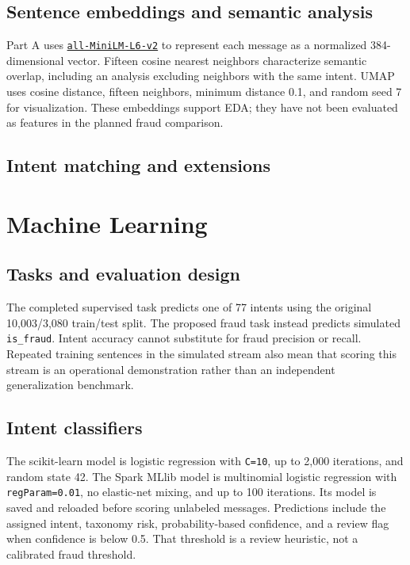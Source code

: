 \documentclass[
  english,
  11pt,
  letterpaper,
]{article}
\begin{document}
\subsection{Sentence embeddings and semantic
analysis}\label{sentence-embeddings-and-semantic-analysis}

Part A uses
\href{https://huggingface.co/sentence-transformers/all-MiniLM-L6-v2}{\texttt{all-MiniLM-L6-v2}}
to represent each message as a normalized 384-dimensional vector.
Fifteen cosine nearest neighbors characterize semantic overlap,
including an analysis excluding neighbors with the same intent. UMAP
uses cosine distance, fifteen neighbors, minimum distance 0.1, and
random seed 7 for visualization. These embeddings support EDA; they have
not been evaluated as features in the planned fraud comparison.

\subsection{Intent matching and
extensions}\label{intent-matching-and-extensions}

\section{Machine Learning}\label{sec-ml}

\subsection{Tasks and evaluation
design}\label{tasks-and-evaluation-design}

The completed supervised task predicts one of 77 intents using the
original 10,003/3,080 train/test split. The proposed fraud task instead
predicts simulated \texttt{is\_fraud}. Intent accuracy cannot substitute
for fraud precision or recall. Repeated training sentences in the
simulated stream also mean that scoring this stream is an operational
demonstration rather than an independent generalization benchmark.

\subsection{Intent classifiers}\label{intent-classifiers}

The scikit-learn model is logistic regression with \texttt{C=10}, up to
2,000 iterations, and random state 42. The Spark MLlib model is
multinomial logistic regression with \texttt{regParam=0.01}, no
elastic-net mixing, and up to 100 iterations. Its model is saved and
reloaded before scoring unlabeled messages. Predictions include the
assigned intent, taxonomy risk, probability-based confidence, and a
review flag when confidence is below 0.5. That threshold is a review
heuristic, not a calibrated fraud threshold.
\end{document}
